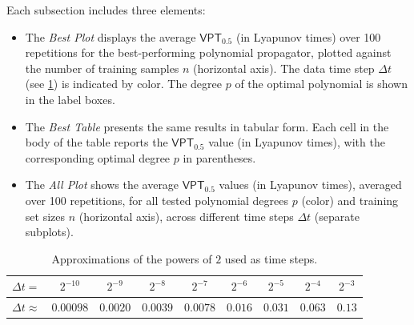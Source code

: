 \documentclass{article}
\newcommand{\stepsize}{\Delta\!t}
\newcommand{\vpt}[1]{\mathsf{VPT}_{#1}}
\begin{document}
Each subsection includes three elements:
\begin{itemize}
	\item
	The \textit{Best Plot} displays the average $\vpt{0.5}$ (in Lyapunov times) over 100 repetitions for the best-performing polynomial propagator, plotted against the number of training samples $n$ (horizontal axis). The data time step $\stepsize$ (see \cref{tbl:timesteps}) is indicated by color. The degree $p$ of the optimal polynomial is shown in the label boxes.
	\item
	The \textit{Best Table} presents the same results in tabular form. Each cell in the body of the table reports the $\vpt{0.5}$ value (in Lyapunov times), with the corresponding optimal degree $p$ in parentheses.
	\item
	The \textit{All Plot} shows the average $\vpt{0.5}$ values (in Lyapunov times), averaged over 100 repetitions, for all tested polynomial degrees $p$ (color) and training set sizes $n$ (horizontal axis), across different time steps $\stepsize$ (separate subplots).
\end{itemize}

\localtableofcontents


\begin{table}[h!]
    \begin{center}
        \begin{tabular}{c|cccccccc}
        $\stepsize = $ & $2^{-10}$ & $2^{-9}$ & $2^{-8}$ & $2^{-7}$ & $2^{-6}$ & $2^{-5}$ & $2^{-4}$ & $2^{-3}$\\
        \hline
        $\stepsize \approx $ & $0.00098$ & $0.0020$ & $0.0039$ & $0.0078$ & $0.016$ & $0.031$ & $0.063$ & $0.13$
    \end{tabular}
    \end{center}
    \caption{Approximations of the powers of $2$ used as time steps.}\label{tbl:timesteps}
\end{table}

\clearpage
\end{document}
